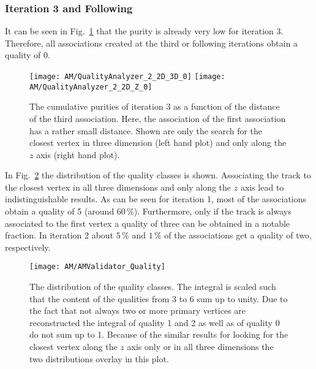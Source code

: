 

\subsubsection{Iteration 3 and Following}

It can be seen in Fig.~\ref{plot:AMWFQualityI30} that the purity is already very low for iteration 3. Therefore, all associations created at the third or following iterations obtain a quality of 0.

\begin{figure}[!ht]
    \centering
    \texttt{[image: AM/QualityAnalyzer\_2\_2D\_3D\_0]}
    \texttt{[image: AM/QualityAnalyzer\_2\_2D\_Z\_0]}
    \caption[Cumulative purities of iteration 3 vs relative difference to define quality for smaller distances of association one]{The cumulative purities of iteration 3 as a function of the distance of the third association. Here, the association of the first association has a rather small distance. Shown are only the search for the closest vertex in three dimension (left hand plot) and only along the $z$ axis (right hand plot).\label{plot:AMWFQualityI30}}
\end{figure}

In Fig.~\ref{plot:AMWFQualityDist} the distribution of the quality classes is shown. Associating the track to the closest vertex in all three dimensions and only along the $z$ axis lead to indistinguishable results. As can be seen for iteration 1, most of the associations obtain a quality of 5 (around $60\,\%$). Furthermore, only if the track is always associated to the first vertex a quality of three can be obtained in a notable fraction. In iteration 2 about $5\,\%$ and $1\,\%$ of the associations get a quality of two, respectively.

\begin{figure}[!ht]
    \centering
    \texttt{[image: AM/AMValidator\_Quality]}
    \caption[Distribution of the quality classes]{The distribution of the quality classes. The integral is scaled such that the content of the qualities from 3 to 6 sum up to unity. Due to the fact that not always two or more primary vertices are reconstructed the integral of quality 1 and 2 as well as of quality 0 do not sum up to 1. Because of the similar results for looking for the closest vertex along the $z$ axis only or in all three dimensions the two distributions overlay in this plot. \label{plot:AMWFQualityDist}}
\end{figure}

